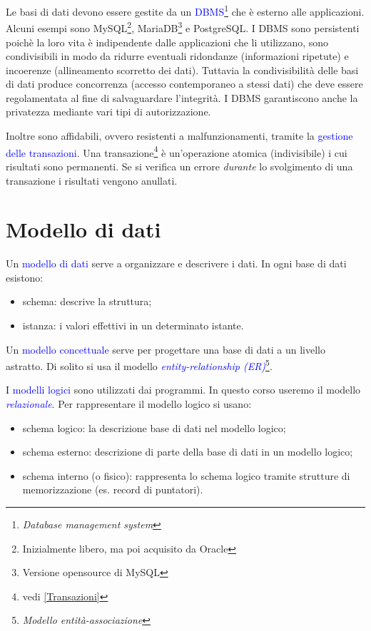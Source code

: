 Le basi di dati devono essere gestite da un \textcolor{blue}{DBMS}\footnote{\textit{Database management system}} che è esterno alle applicazioni. Alcuni esempi sono MySQL\footnote{Inizialmente libero, ma poi acquisito da Oracle}, MariaDB\footnote{Versione opensource di MySQL} e PostgreSQL. I DBMS sono persistenti poichè la loro vita è indipendente dalle applicazioni che li utilizzano, sono condivisibili in modo da ridurre eventuali ridondanze (informazioni ripetute) e incoerenze (allineamento scorretto dei dati). Tuttavia la condivisibilità delle basi di dati produce concorrenza (accesso contemporaneo a stessi dati) che deve essere regolamentata al fine di salvaguardare l'integrità. I DBMS garantiscono anche la privatezza mediante vari tipi di autorizzazione. 

Inoltre sono affidabili, ovvero resistenti a malfunzionamenti, tramite la \textcolor{blue}{gestione delle transazioni}. Una transazione\footnote{vedi \ref{Transazioni}} è un'operazione atomica (indivisibile) i cui risultati sono permanenti. Se si verifica un errore \textit{durante} lo svolgimento di una transazione i risultati vengono anullati.

\section{Modello di dati}

Un \textcolor{blue}{modello di dati} serve a organizzare e descrivere i dati. In ogni base di dati esistono:
\begin{itemize}
    \item schema: descrive la struttura;
    \item istanza: i valori effettivi in un determinato istante.
\end{itemize}

Un \textcolor{blue}{modello concettuale} serve per progettare una base di dati a un livello astratto. Di solito si usa il modello \textcolor{blue}{\textit{entity-relationship (ER)}}\footnote{\textit{Modello entità-associazione}}.

I \textcolor{blue}{modelli logici} sono utilizzati dai programmi. In questo corso useremo il modello \textcolor{blue}{\textit{relazionale}}.
Per rappresentare il modello logico si usano:
\begin{itemize}
    \item schema logico: la descrizione base di dati nel modello logico;
    \item schema esterno: descrizione di parte della base di dati in un modello logico;
    \item schema interno (o fisico): rappresenta lo schema logico tramite strutture di memorizzazione (es. record di puntatori).
\end{itemize}

